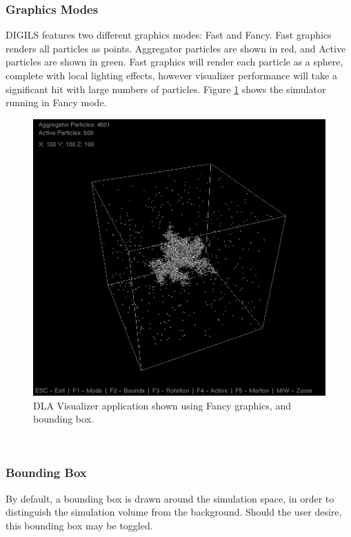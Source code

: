\documentclass[fleqn,10pt]{UserGuideArx} %
\begin{document}
\subsubsection{Graphics Modes}
DIGILS features two different graphics modes: Fast and Fancy. Fast graphics renders all particles as points. Aggregator particles are shown in red, and Active particles are shown in green. Fast graphics will render each particle as a sphere, complete with local lighting effects, however visualizer performance will take a significant hit with large numbers of particles. Figure \ref{fig:Fancy} shows the simulator running in Fancy mode.

\begin{figure}[!h]\centering %
    \includegraphics[width=\linewidth]{images/Fancy.png}
    \caption{DLA Visualizer application shown using Fancy graphics, and bounding box.}
    \label{fig:Fancy}
    \end{figure}

~\\
\subsubsection{Bounding Box}
By default, a bounding box is drawn around the simulation space, in order to distinguish the simulation volume from the background. Should the user desire, this bounding box may be toggled.\\
\end{document}

